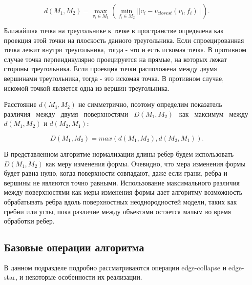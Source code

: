 \documentclass[14pt]{article}
\numberwithin{figure}{section}
\numberwithin{equation}{section}
\begin{document}
\begin{equation}
	d(M_1, M_2) = \max_{v_i \in M_1}(\min_{f_i \in M_2}||v_i - v_{closest}(v_i, f_i)||).
\end{equation}


Ближайшая точка на треугольнике к точке в пространстве определена как проекция этой точки на плоскость данного треугольника. Если спроецированная точка лежит внутри треугольника, тогда - это и есть искомая точка. В противном случае точка перпендикулярно проецируется на прямые, на которых лежат стороны треугольника. Если проекция точки расположена между двумя вершинами треугольника, тогда - это искомая точка. В противном случае, искомой точкой является одна из вершин треугольника.


Расстояние $d(M_1, M_2)$ не симметрично, поэтому определим показатель различия \ между \  двумя \ поверхностями \ $D(M_1, M_2)$ \ как \ максимум \ между $d(M_1, M_2)$ и $d(M_2, M_1)$:

\begin{equation}
	D(M_1, M_2) = max(d(M_1, M_2), d(M_2, M_1)).
\end{equation}

В представленном алгоритме нормализации длины ребер будем использовать $D(M_1, M_2)$ как меру изменения формы. Очевидно, что мера изменения формы будет равна нулю, когда поверхности совпадают, даже если грани, ребра и вершины не являются точно равными. Использование максимального различия между поверхностями как меры изменения формы дает алгоритму возможность обрабатывать ребра вдоль поверхностных неоднородностей модели, таких как гребни или углы, пока различие между объектами остается малым во время обработки ребер.


\subsection{Базовые операции алгоритма}

В данном подразделе подробно рассматриваются операции edge-collapse и edge-star, и некоторые особенности их реализации.
\end{document}
